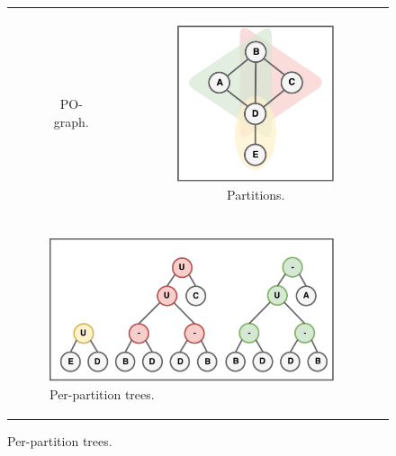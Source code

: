 \begin{figure}[htb]
\begin{tabular}[c]{ccc}
\begin{subfigure}[c]{0.30\linewidth}
			\caption{\ac{PO}-graph.}
			\label{fig:pipe1}
		\end{subfigure}&
		\begin{subfigure}[c]{0.30\linewidth}
			\includegraphics[width=\textwidth]{figures/pipe_2.pdf}
			\caption{Partitions.}
			\label{fig:pipe2}
		\end{subfigure}\\
		\\
		\multicolumn{2}{l}{
			\begin{subfigure}[l]{0.60\linewidth}
				\includegraphics[width=\textwidth]{figures/pipe_4.pdf}
				\caption{Per-partition trees.}
				\label{fig:pipe3}
			\end{subfigure}
}
\end{tabular}
\end{figure}
